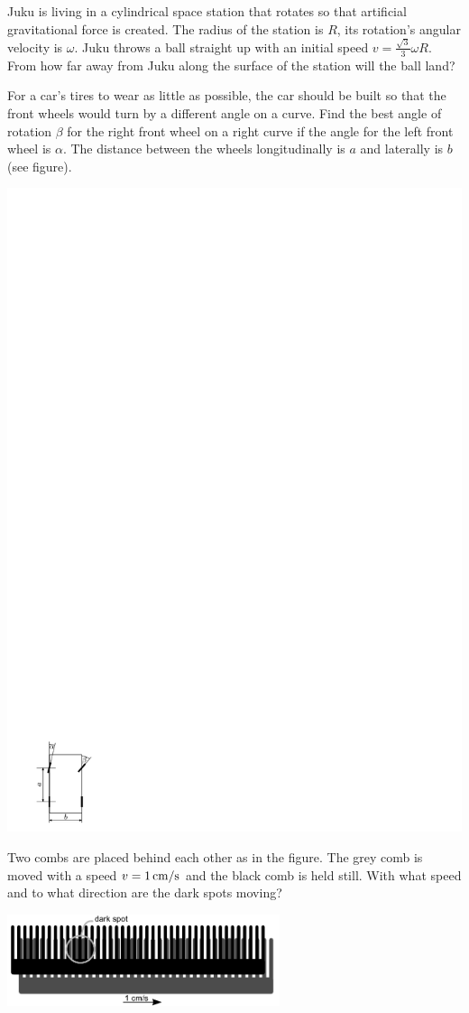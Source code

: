 \documentclass[11pt]{article}
\begin{document}

\probeng
Juku is living in a cylindrical space station that rotates so that artificial gravitational force is created. The radius of the station is $R$, its rotation’s angular velocity is $\omega$. Juku throws a ball straight up with an initial speed $v=\frac{\sqrt{3}}{3}\omega R$. From how far away from Juku along the surface of the station will the ball land?
\probend
\bigskip


\probeng
For a car’s tires to wear as little as possible, the car should be built so that the front wheels would turn by a different angle on a curve. Find the best angle of rotation $\beta$ for the right front wheel on a right curve if the angle for the left front wheel is $\alpha$. The distance between the wheels longitudinally is $a$ and laterally is $b$ (see figure).
\begin{center}
\includegraphics[width=0.3\linewidth]{2012-v3g-05-r_yl_joonis}%
\end{center}
\probend
\bigskip


\probeng
Two combs are placed behind each other as in the figure. The grey comb is moved with a speed $v=\SI 1{cm/s}$ and the black comb is held still.  With what speed and to what direction are the dark spots moving?
\begin{center}
\includegraphics[width=0.6\textwidth]{2014-v3g-05-kammid_ing}
\end{center}
\probend
\bigskip
\end{document}
